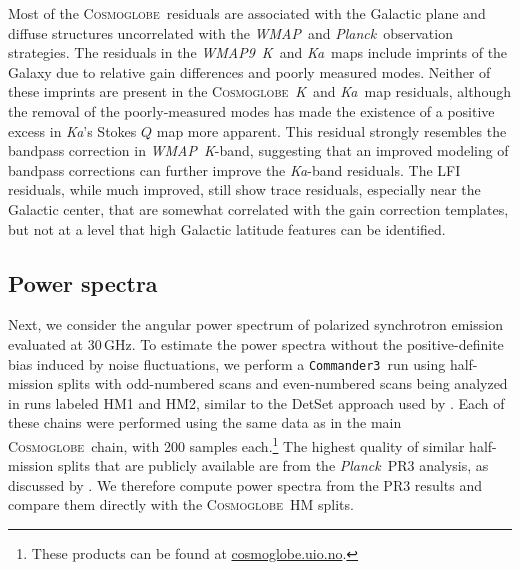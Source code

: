 \documentclass[twocolumn]{../../common/aa}
\def\WMAP{\emph{WMAP}}
\def\WMAPnine{\emph{WMAP9}}
\def\Planck{\emph{Planck}}
\def\commanderthree{\texttt{Commander3}}
\newcommand{\cosmoglobe}{\textsc{Cosmoglobe}}
\newcommand{\K}[0]{\textit K}
\newcommand{\Ka}[0]{\textit{Ka}}
\begin{document}
Most of the \cosmoglobe\ residuals are associated with the Galactic plane and diffuse structures uncorrelated with the \WMAP\ and \Planck\ observation strategies. 
The residuals in the \WMAPnine\ \K\ and \Ka\ maps include imprints of the Galaxy due to relative gain differences and poorly measured modes. Neither of these imprints are present in the \cosmoglobe\ \K\ and \Ka\ map residuals, although the removal of the poorly-measured modes has made the existence of a positive excess in \Ka's Stokes $Q$ map more apparent.
This residual  strongly resembles the bandpass correction in \WMAP\ \K-band, suggesting that an improved modeling of bandpass corrections can further improve the \Ka-band residuals.
The LFI residuals, while much improved, still show trace residuals, especially near the Galactic center, that are somewhat correlated with the gain correction templates, but not at a level that high Galactic latitude features can be identified. 



\subsection{Power spectra}
\label{sec:powspec}


Next, we consider the angular power spectrum of polarized synchrotron emission evaluated at 30\,GHz. To estimate the power spectra without the positive-definite bias induced by noise fluctuations, we perform a \commanderthree\ run using half-mission splits with odd-numbered scans and even-numbered scans being analyzed in runs labeled HM1 and HM2, similar to the DetSet approach used by \citet{planck2014-XXX}. Each of these chains were performed using the same data as in the main \cosmoglobe\ chain, with 200 samples each.\footnote{These products can be found at \url{cosmoglobe.uio.no}.}
The highest quality of similar half-mission splits that are publicly available are from the \Planck\ PR3 analysis, as discussed by \citet{planck2016-l04}. We therefore compute power spectra from the PR3 results and compare them directly with the \cosmoglobe\ HM splits.
\end{document}
